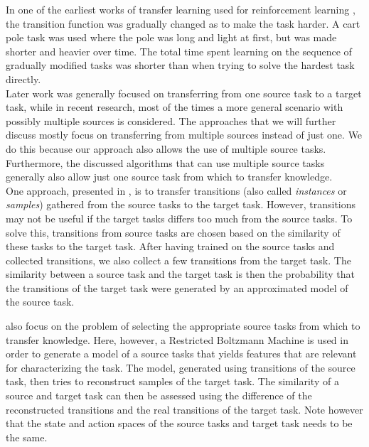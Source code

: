In one of the earliest works of transfer learning used for reinforcement learning \citep{conf/ijcai/SelfridgeSB85}, the transition function was gradually changed as to make the task harder. A cart pole task was used where the pole was long and light at first, but was made shorter and heavier over time. The total time spent learning on the sequence of gradually modified tasks was shorter than when trying to solve the hardest task directly.\\

Later work was generally focused on transferring from one source task to a target task, while in recent research, most of the times a more general scenario with possibly multiple sources is considered. The approaches that we will further discuss mostly focus on transferring from multiple sources instead of just one. We do this because our approach also allows the use of multiple source tasks. Furthermore, the  discussed algorithms that can use multiple source tasks generally also allow just one source task from which to transfer knowledge.\\

One approach, presented in \cite{lazaric2008transfer}, is to transfer transitions (also called \textit{instances} or \textit{samples}) gathered from the source tasks to the target task. However, transitions may not be useful if the target tasks differs too much from the source tasks. To solve this, transitions from source tasks are chosen based on the similarity of these tasks to the target task. After having trained on the source tasks and collected transitions, we also collect a few transitions from the target task. The similarity between a source task and the target task is then the probability that the transitions of the target task were generated by an approximated model of the source task.

\cite{Ammar2014} also focus on the problem of selecting the appropriate source tasks from which to transfer knowledge. Here, however, a Restricted Boltzmann Machine \citep{Smolensky1986} is used in order to generate a model of a source tasks that yields features that are relevant for characterizing the task. The model, generated using transitions of the source task, then tries to reconstruct samples of the target task. The similarity of a source and target task can then be assessed using the difference of the reconstructed transitions and the real transitions of the target task. Note however that the state and action spaces of the source tasks and target task needs to be the same.\\

